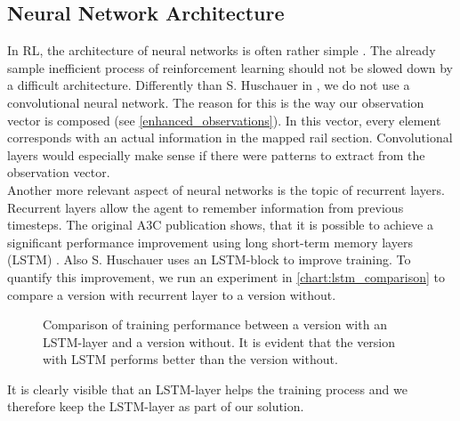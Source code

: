 \subsection*{Neural Network Architecture}\label{network_architecture}
In RL, the architecture of neural networks is often rather simple \cite{mnih2013playing}\cite{a3c}. The already sample inefficient process of reinforcement learning should not be slowed down by a difficult architecture. Differently than S. Huschauer in \cite{flatlandstephan}, we do not use a convolutional neural network. The reason for this is the way our observation vector is composed (see \autoref{enhanced_observations}). In this vector, every element corresponds with an actual information in the mapped rail section. Convolutional layers would especially make sense if there were patterns to extract from the observation vector.\\
Another more relevant aspect of neural networks is the topic of recurrent layers. Recurrent layers allow the agent to remember information from previous timesteps. The original A3C publication shows, that it is possible to achieve a significant performance improvement using long short-term memory layers (LSTM) \cite{a3c}. Also S. Huschauer uses an LSTM-block to improve training. To quantify this improvement, we run an experiment in \autoref{chart:lstm_comparison} to compare a version with recurrent layer to a version without.

\begin{figure}[H]
	\begin{center}
		
	\end{center}
	\caption{Comparison of training performance between a version with an LSTM-layer and a version without. It is evident that the version with LSTM performs better than the version without.}
	\label{chart:lstm_comparison}
\end{figure}

It is clearly visible that an LSTM-layer helps the training process and we therefore keep the LSTM-layer as part of our solution.

